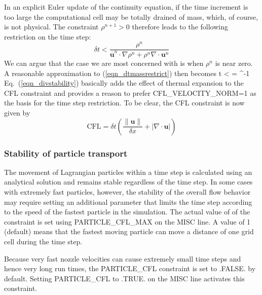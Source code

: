 \documentclass[11pt]{book}
\begin{document}
In an explicit Euler update of the continuity equation, if the time increment is too large the computational cell may be totally drained of mass, which, of course, is not physical. The constraint $\rho^{n+1}>0$ therefore leads to the following restriction on the time step:
\begin{equation}
\label{eqn_dtmassrestrict}
\delta t < \frac{\rho^n}{\overline{\mathbf{u}}^n\cdot\nabla\rho^n + \rho^n \nabla\cdot\mathbf{u}^n}
\end{equation}
We can argue that the case we are most concerned with is when $\rho^n$ is near zero.  A reasonable approximation to (\ref{eqn_dtmassrestrict}) then becomes
\be
\label{eqn_divstability}
\delta t < 
  = ^{-1}
\ee
Eq.~(\ref{eqn_divstability}) basically adds the effect of thermal expansion to the CFL constraint and provides a reason to prefer {\ct CFL\_VELOCITY\_NORM=1}
as the basis for the time step restriction. To be clear, the CFL constraint is now given by
\begin{equation}
\mbox{CFL} = \delta t \left( \frac{\|\mathbf{u}\|}{\delta x} + |\nabla\cdot\mathbf{u}| \right)
\end{equation}

\subsubsection{Stability of particle transport}
\label{info:PART_Stability}

The movement of Lagrangian particles within a time step is calculated using an analytical solution and remains stable regardless of the time step. In some cases with extremely fast particles, however, the stability of the overall flow behavior may require setting an additional parameter that limits the time step according to the speed of the fastest particle in the simulation.  The actual value of of the constraint is set using {\ct PARTICLE\_CFL\_MAX} on the {\ct MISC} line. A value of 1 (default) means that the fastest moving particle can move a distance of one grid cell during the time step.

Because very fast nozzle velocities can cause extremely small time steps and hence very long run times, the {\ct PARTICLE\_CFL} constraint is set to {\ct .FALSE.} by default.  Setting {\ct PARTICLE\_CFL} to {\ct .TRUE.} on the {\ct MISC} line activates this constraint.
\end{document}
